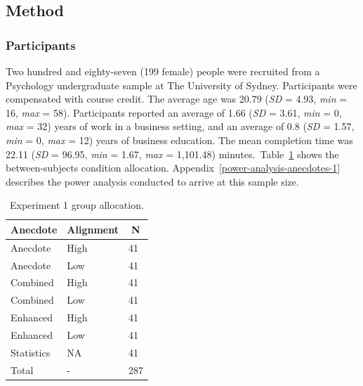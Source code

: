 \documentclass[a4paper, nobind, dvipsnames]{templates/ociamthesis}
\theoremstyle{definition}
\theoremstyle{definition}
\theoremstyle{definition}
\theoremstyle{definition}
\theoremstyle{remark}
\begin{document}
\hypertarget{method-anecdotes-1}{%
\subsection{Method}\label{method-anecdotes-1}}

\hypertarget{participants-5}{%
\subsubsection{Participants}\label{participants-5}}

Two hundred and eighty-seven (199 female) people were recruited from a Psychology undergraduate sample at The University of Sydney. Participants were compensated with course credit. The average age was 20.79 (\emph{SD} = 4.93, \emph{min} = 16, \emph{max} = 58). Participants reported an average of 1.66 (\emph{SD} = 3.61, \emph{min} = 0, \emph{max} = 32) years of work in a business setting, and an average of 0.8 (\emph{SD} = 1.57, \emph{min} = 0, \emph{max} = 12) years of business education. The mean completion time was 22.11 (\emph{SD} = 96.95, \emph{min} = 1.67, \emph{max} = 1,101.48) minutes.~Table~\ref{tab:condition-allocation-anecdotes-1}
shows the between-subjects condition allocation.
Appendix~\ref{power-analysis-anecdotes-1} describes the power analysis
conducted to arrive at this sample size.

\begin{table}[tbp]

\begin{center}
\begin{threeparttable}

\caption{\label{tab:condition-allocation-anecdotes-1}Experiment 1 group allocation.}

\begin{tabular}{lll}
\toprule
Anecdote & \multicolumn{1}{c}{Alignment} & \multicolumn{1}{c}{N}\\
\midrule
Anecdote & High & 41\\
Anecdote & Low & 41\\
Combined & High & 41\\
Combined & Low & 41\\
Enhanced & High & 41\\
Enhanced & Low & 41\\
Statistics & NA & 41\\
Total & - & 287\\
\bottomrule
\end{tabular}

\end{threeparttable}
\end{center}

\end{table}
\end{document}
